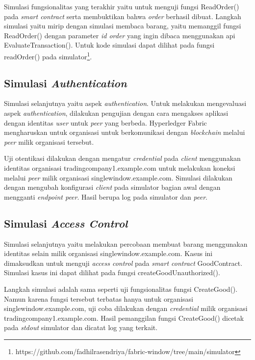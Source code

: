 Simulasi fungsionalitas yang terakhir yaitu untuk menguji fungsi ReadOrder() pada \textit{smart contract} serta membuktikan bahwa \textit{order} berhasil dibuat. Langkah simulasi yaitu mirip dengan simulasi membaca barang, yaitu memanggil fungsi ReadOrder() dengan parameter \textit{id order} yang ingin dibaca menggunakan api EvaluateTransaction(). Untuk kode simulasi dapat dilihat pada fungsi readOrder() pada simulator\footnote{https://github.com/fadhilrasendriya/fabric-window/tree/main/simulator}.

\subsection{Simulasi \textit{Authentication}}

Simulasi selanjutnya yaitu aspek \textit{authentication}. Untuk melakukan mengevaluasi aspek \textit{authentication}, dilakukan pengujian dengan cara mengakses aplikasi dengan identitas \textit{user} untuk \textit{peer} yang berbeda. Hyperledger Fabric mengharuskan untuk organisasi untuk berkomunikasi dengan \textit{blockchain} melalui \textit{peer} milik organisasi tersebut.

Uji otentikasi dilakukan dengan mengatur \textit{credential} pada \textit{client} menggunakan identitas organisasi tradingcompany1.example.com untuk melakukan koneksi melalui \textit{peer} milik organisasi singlewindow.example.com. Simulasi dilakukan dengan mengubah konfigurasi \textit{client} pada simulator bagian awal dengan mengganti \textit{endpoint peer}. Hasil berupa log pada simulator dan \textit{peer}.


\subsection{Simulasi \textit{Access Control}}
Simulasi selanjutnya yaitu melakukan percobaan membuat barang menggunakan identitas selain milik organisasi singlewindow.example.com. Kasus ini dimaksudkan untuk menguji \textit{access control} pada \textit{smart contract} GoodContract. Simulasi kasus ini dapat dilihat pada fungsi createGoodUnauthorized().

Langkah simulasi adalah sama seperti uji fungsionalitas fungsi CreateGood(). Namun karena fungsi tersebut terbatas hanya untuk organisasi singlewindow.example.com, uji coba dilakukan dengan \textit{credential} milik organisasi tradingcompany1.example.com. Hasil pemanggilan fungsi CreateGood() dicetak pada \textit{stdout} simulator dan dicatat log yang terkait.



